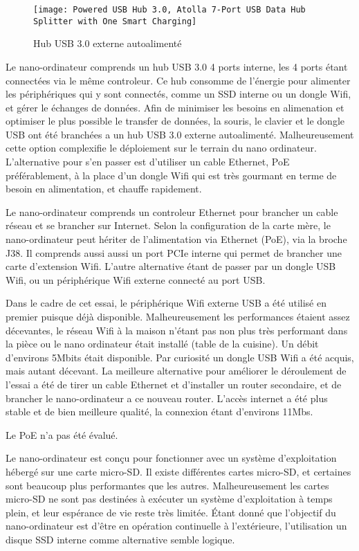 \begin{figure}[H]
    \centering
    \texttt{[image: Powered USB Hub 3.0, Atolla 7-Port USB Data Hub Splitter with One Smart Charging]}
    \caption{Hub USB 3.0 externe autoalimenté}
    \label{fig:hubusb}
\end{figure}
\par Le nano-ordinateur comprends un hub USB 3.0 4 ports interne, les 4 ports étant connectées via le même controleur. Ce hub consomme de l'énergie pour alimenter les périphériques qui y sont connectés, comme un SSD interne ou un dongle Wifi, et gérer le échanges de données. Afin de minimiser les besoins en alimenation et optimiser le plus possible le transfer de données, la souris, le clavier et le dongle USB ont été branchées a un hub USB 3.0 externe autoalimenté. Malheureusement cette option complexifie le déploiement sur le terrain du nano ordinateur. L'alternative pour s'en passer est d'utiliser un cable Ethernet, PoE préférablement, à la place d'un dongle Wifi qui est très gourmant en terme de besoin en alimentation, et chauffe rapidement.
\par Le nano-ordinateur comprends un controleur Ethernet pour brancher un cable réseau et se brancher sur Internet. Selon la configuration de la carte mère, le nano-ordinateur peut hériter de l'alimentation via Ethernet (PoE), via la broche J38. Il comprends aussi aussi un port PCIe interne qui permet de brancher une carte d'extension Wifi. L'autre alternative étant de passer par un dongle USB Wifi, ou un périphérique Wifi externe connecté au port USB. 
\par Dans le cadre de cet essai, le périphérique Wifi externe USB a été utilisé en premier puisque déjà disponible. Malheureusement les performances étaient assez décevantes, le réseau Wifi à la maison n'étant pas non plus très performant dans la pièce ou le nano ordinateur était installé (table de la cuisine). Un débit d'environs 5Mbits était disponible. Par curiosité un dongle USB Wifi a été acquis, mais autant décevant. La meilleure alternative pour améliorer le déroulement de l'essai a été de tirer un cable Ethernet et d'installer un router secondaire, et de brancher le nano-ordinateur a ce nouveau router. L'accès internet a été plus stable et de bien meilleure qualité, la connexion étant d'environs 11Mbs. 
\par Le PoE n'a pas été évalué. 
\par Le nano-ordinateur est conçu pour fonctionner avec un système  d'exploitation hébergé sur une carte micro-SD. Il existe différentes cartes micro-SD, et certaines sont  beaucoup plus performantes que les autres. Malheureusement les cartes micro-SD ne sont pas destinées à exécuter un système d'exploitation à temps plein, et leur espérance de vie reste très limitée.  Étant donné que l'objectif du nano-ordinateur est d'être en opération continuelle à l'extérieure, l'utilisation un disque SSD interne comme alternative semble logique.
